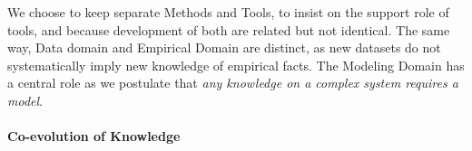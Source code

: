 \documentclass[runningheads,a4paper]{llncs2e/llncs}
\begin{document}
We choose to keep separate Methods and Tools, to insist on the support role of tools, and because development of both are related but not identical. The same way, Data domain and Empirical Domain are distinct, as new datasets do not systematically imply new knowledge of empirical facts. %
 The Modeling Domain has a central role as we postulate that \emph{any knowledge on a complex system requires a model}. 



\paragraph{Co-evolution of Knowledge}




\end{document}
